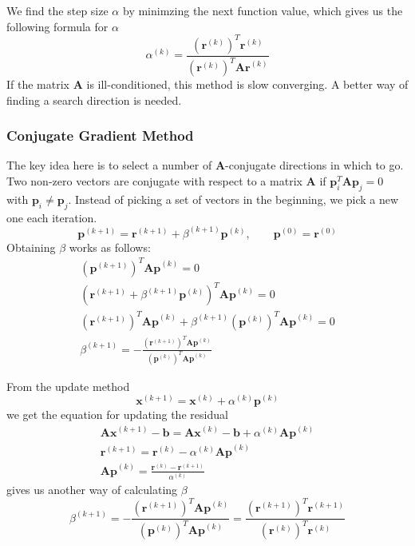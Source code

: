 \documentclass{article}
\begin{document}
We find the step size $\alpha$ by minimzing the next function value, which gives us the following formula for $\alpha$
\begin{equation}
    \alpha^{(k)} = \frac{(\bm{r}^{(k)})^T \bm{r}^{(k)}}{(\bm{r}^{(k)})^T \bm{Ar}^{(k)}}
\end{equation}
If the matrix $\bm{A}$ is ill-conditioned, this method is slow converging.
A better way of finding a search direction is needed.

\subsubsection{Conjugate Gradient Method}
The key idea here is to select a number of $\bm{A}$-conjugate directions in which to go.
Two non-zero vectors are conjugate with respect to a matrix $\bm{A}$ if $\bm{p}_i^T \bm{Ap}_j = 0$ with $\bm{p}_i \neq \bm{p}_j$.
Instead of picking a set of vectors in the beginning, we pick a new one each iteration.
\begin{equation}
    \bm{p}^{(k+1)} = \bm{r}^{(k+1)} + \beta^{(k+1)} \bm{p}^{(k)}, \qquad \bm{p}^{(0)} = \bm{r}^{(0)}
\end{equation}
Obtaining $\beta$ works as follows:
\begin{gather}
    (\bm{p}^{(k+1)})^T \bm{Ap}^{(k)} = 0\\
    (\bm{r}^{(k+1)} + \beta^{(k+1)} \bm{p}^{(k)})^T \bm{Ap}^{(k)} = 0\\
    (\bm{r}^{(k+1)})^T \bm{Ap}^{(k)} + \beta^{(k+1)} (\bm{p}^{(k)})^T \bm{Ap}^{(k)} = 0\\
    \beta^{(k+1)} = - \frac{(\bm{r}^{(k+1)})^T \bm{Ap}^{(k)}}{(\bm{p}^{(k)})^T \bm{Ap}^{(k)}}
\end{gather}

From the update method
\begin{equation}
    \bm{x}^{(k+1)} = \bm{x}^{(k)} + \alpha^{(k)} \bm{p}^{(k)}
\end{equation}
we get the equation for updating the residual
\begin{gather}
    \bm{Ax}^{(k+1)} - \bm{b} = \bm{Ax}^{(k)} - \bm{b} + \alpha^{(k)} \bm{Ap}^{(k)}\\
    \bm{r}^{(k+1)} = \bm{r}^{(k)} - \alpha^{(k)} \bm{Ap}^{(k)}\\
    \label{eq:equivalency}
    \bm{Ap}^{(k)} = \frac{\bm{r}^{(k)} - \bm{r}^{(k+1)}}{\alpha^{(k)}}
\end{gather}
 gives us another way of calculating $\beta$
\begin{equation}
    \beta^{(k+1)} = - \frac{(\bm{r}^{(k+1)})^T \bm{Ap}^{(k)}}{(\bm{p}^{(k)})^T \bm{Ap}^{(k)}} = \frac{(\bm{r}^{(k+1)})^T \bm{r}^{(k+1)}}{(\bm{r}^{(k)})^T \bm{r}^{(k)}}
\end{equation}
\end{document}
